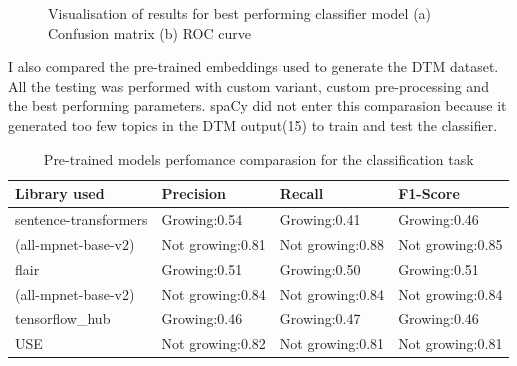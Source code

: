\documentclass[12pt,MSc,a4paper,oneside]{muthesis}
\begin{document}
    \begin{figure}[h]
      \centering
      \caption{Visualisation of results for best performing classifier model (a) Confusion matrix (b) ROC curve}
      \label{fig:foobar}
    \end{figure}

    I also compared the pre-trained embeddings used to generate the DTM dataset. All the testing was performed with custom variant, custom pre-processing and the best performing parameters. spaCy did not enter this comparasion because it generated too few topics in the DTM output(15) to train and test the classifier.
    \begin{table}[h]
      \caption{Pre-trained models perfomance comparasion for the classification task}
      \label{tab:pretrained-models}
      \begin{tabularx}{\textwidth}{|X|X|X|X|}
        \toprule
        {Library used}&{Precision}&{Recall}&{F1-Score}\\
        \midrule
        sentence-transformers & Growing:0.54 & Growing:0.41 & Growing:0.46 \\
        (all-mpnet-base-v2) & Not growing:0.81 & Not growing:0.88 & Not growing:0.85\\\hline
        flair & Growing:0.51 & Growing:0.50 & Growing:0.51 \\
        (all-mpnet-base-v2) & Not growing:0.84 & Not growing:0.84 & Not growing:0.84\\\hline
        tensorflow\_hub & Growing:0.46 & Growing:0.47 & Growing:0.46 \\
        USE & Not growing:0.82 & Not growing:0.81 & Not growing:0.81\\\hline
        \bottomrule
      \end{tabularx}
    \end{table}
\end{document}
